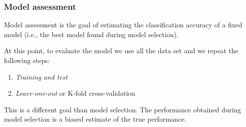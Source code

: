 \subsubsection{Model assessment}

Model assessment is the goal of estimating the classification accuracy of a fixed model (i.e., the best model found during model selection).

At this point, to evaluate the model we use all the data set and we repeat the following steps:
\begin{enumerate}
\item \emph{Training and test}
\item \emph{Leave-one-out} or {K-fold cross-validation}
\end{enumerate}

This is a different goal than model selection. The performance obtained during model selection is a biased estimate of the true performance.